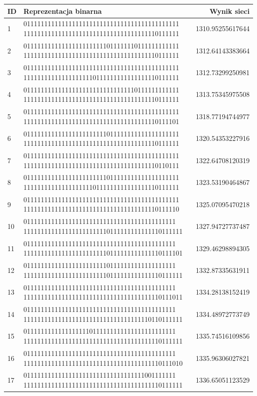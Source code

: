 \documentclass[twoside,12pt]{report}
\begin{document}
\begin{minipage}{\linewidth}
\label{tab_best} 
\begin{tabularx}{\linewidth}{ | l | X | r | }
	\hline
	ID & Reprezentacja binarna & Wynik sieci \\
	\hline
	1 & 011111111111111111111111111111111111111111111 	111111111111111111111111111111111111110111111 & 1310.95255617644 \\ \hline
	2 & 011111111111111111111111011111110111111111111 111111111111111111111111111111111111110111111 & 1312.64143383664 \\ \hline
	3 & 011111111111111111111111111111111111111111111 111111111111111111110111111111111111110111111 & 1312.73299250981 \\ \hline
	4 & 011111111111111111111111111111110111111111111 111111111111111111111111111111111111110111111 & 1313.75345975508 \\ \hline
	5 & 011111111111111111111111111111111111111111111 111111111111111111111111111111111111110111101 & 1318.77194744977 \\ \hline
	6 & 011111111111111111111111011111111111111111111 111111111111111111111111111111111111110111111 & 1320.54353227916 \\ \hline
	7 & 011111111111111111111111111111111111111111111 111111111111111111111111111111111111110110111 & 1322.64708120319 \\ \hline
	8 & 011111111111111111111111011111111111111111111 111111111111111111110111111111111111110111111 & 1323.53190464867 \\ \hline
	9 & 011111111111111111111111111111111111111111111 111111111111111111111111111111111111110111110 & 1325.07095470218 \\ \hline
	10 & 01111111111111111111111111111111111111111111 1111111111111111111111110111111111111110111111 & 1327.94727737487 \\ \hline
	11 & 01111111111111111111111111111111111111111111 1111111111111111111111110111111111111110111101 & 1329.46298894305 \\ \hline
	12 & 01111111111111111111111101111111111111111111 1111111111111111111111110111111111111110111111 & 1332.87335631911 \\ \hline
	13 & 01111111111111111111111111111111111111111111 1111111111111111111111111111111111111110111011 & 1334.28138152419 \\ \hline
	14 & 01111111111111111111111111111111111111111111 1111111111111111111111111111111111110110111111 & 1334.48972773749 \\ \hline
	15 & 01111111111111111110111111111111111111111111 1111111111111111111111111111111111111110111111 & 1335.74516109856 \\ \hline
	16 & 01111111111111111111111111111111111111111111 1111111111111111111111111111111111111110111010 & 1335.96306027821 \\ \hline
	17 & 01111111111111111111111111111111111001111111 1111111111111111111111111111111111111110111111 & 1336.65051123529 \\ \hline
\end{tabularx}
\end{minipage}%
\end{document}
